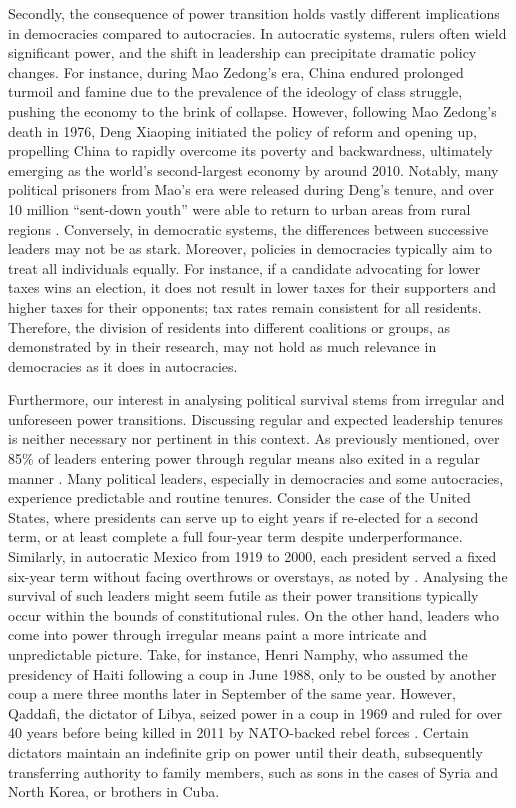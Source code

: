 \documentclass[
  12pt,
  a4paper,
  12pt]{article}
\begin{document}
Secondly, the consequence of power transition holds vastly different
implications in democracies compared to autocracies. In autocratic
systems, rulers often wield significant power, and the shift in
leadership can precipitate dramatic policy changes. For instance, during
Mao Zedong's era, China endured prolonged turmoil and famine due to the
prevalence of the ideology of class struggle, pushing the economy to the
brink of collapse. However, following Mao Zedong's death in 1976, Deng
Xiaoping initiated the policy of reform and opening up, propelling China
to rapidly overcome its poverty and backwardness, ultimately emerging as
the world's second-largest economy by around 2010. Notably, many
political prisoners from Mao's era were released during Deng's tenure,
and over 10 million ``sent-down youth'' were able to return to urban
areas from rural regions \citep{spence1990search}. Conversely, in
democratic systems, the differences between successive leaders may not
be as stark. Moreover, policies in democracies typically aim to treat
all individuals equally. For instance, if a candidate advocating for
lower taxes wins an election, it does not result in lower taxes for
their supporters and higher taxes for their opponents; tax rates remain
consistent for all residents. Therefore, the division of residents into
different coalitions or groups, as demonstrated by
\citet{buenodemesquita2003} in their research, may not hold as much
relevance in democracies as it does in autocracies.

Furthermore, our interest in analysing political survival stems from
irregular and unforeseen power transitions. Discussing regular and
expected leadership tenures is neither necessary nor pertinent in this
context. As previously mentioned, over 85\% of leaders entering power
through regular means also exited in a regular manner
\citep{goemans2009}. Many political leaders, especially in democracies
and some autocracies, experience predictable and routine tenures.
Consider the case of the United States, where presidents can serve up to
eight years if re-elected for a second term, or at least complete a full
four-year term despite underperformance. Similarly, in autocratic Mexico
from 1919 to 2000, each president served a fixed six-year term without
facing overthrows or overstays, as noted by \citep{klesner2019}.
Analysing the survival of such leaders might seem futile as their power
transitions typically occur within the bounds of constitutional rules.
On the other hand, leaders who come into power through irregular means
paint a more intricate and unpredictable picture. Take, for instance,
Henri Namphy, who assumed the presidency of Haiti following a coup in
June 1988, only to be ousted by another coup a mere three months later
in September of the same year. However, Qaddafi, the dictator of Libya,
seized power in a coup in 1969 and ruled for over 40 years before being
killed in 2011 by NATO-backed rebel forces \citep{goemans2009}. Certain
dictators maintain an indefinite grip on power until their death,
subsequently transferring authority to family members, such as sons in
the cases of Syria and North Korea, or brothers in Cuba.
\end{document}
